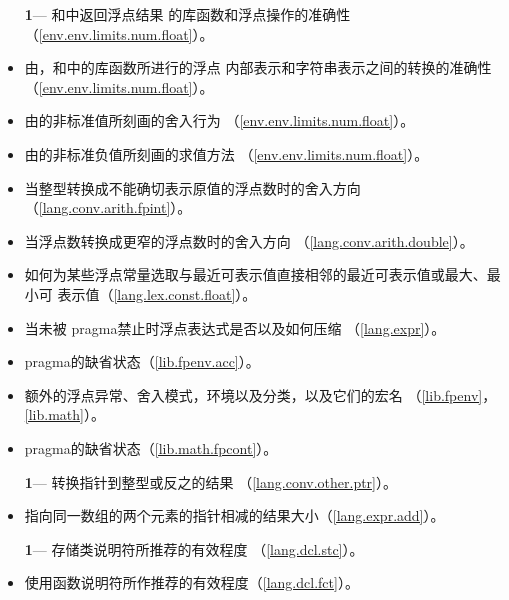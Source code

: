 \begin{itemize} %
  \item[\textbf{1}\hspace{5pt}---]{和中返回浮点结果
    的库函数和浮点操作的准确性（\ref{env.env.limits.num.float}）。}
  \item{由，和中的库函数所进行的浮点
    内部表示和字符串表示之间的转换的准确性（\ref{env.env.limits.num.float}）。}
  \item{由的非标准值所刻画的舍入行为
    （\ref{env.env.limits.num.float}）。}
  \item{由的非标准负值所刻画的求值方法
    （\ref{env.env.limits.num.float}）。}
  \item{当整型转换成不能确切表示原值的浮点数时的舍入方向
    （\ref{lang.conv.arith.fpint}）。}
  \item{当浮点数转换成更窄的浮点数时的舍入方向
    （\ref{lang.conv.arith.double}）。}
  \item{如何为某些浮点常量选取与最近可表示值直接相邻的最近可表示值或最大、最小可
    表示值（\ref{lang.lex.const.float}）。}
  \item{当未被 pragma禁止时浮点表达式是否以及如何压缩
    （\ref{lang.expr}）。}
  \item{ pragma的缺省状态（\ref{lib.fpenv.acc}）。}
  \item{额外的浮点异常、舍入模式，环境以及分类，以及它们的宏名
    （\ref{lib.fpenv}，\ref{lib.math}）。}
  \item{ pragma的缺省状态（\ref{lib.math.fpcont}）。}
\end{itemize}

\begin{itemize}
  \item[\textbf{1}\hspace{5pt}---]{转换指针到整型或反之的结果
    （\ref{lang.conv.other.ptr}）。}
  \item{指向同一数组的两个元素的指针相减的结果大小（\ref{lang.expr.add}）。}
\end{itemize}

\begin{itemize}
  \item[\textbf{1}\hspace{5pt}---]{存储类说明符所推荐的有效程度
    （\ref{lang.dcl.stc}）。}
  \item{使用函数说明符所作推荐的有效程度（\ref{lang.dcl.fct}）。}
\end{itemize}

